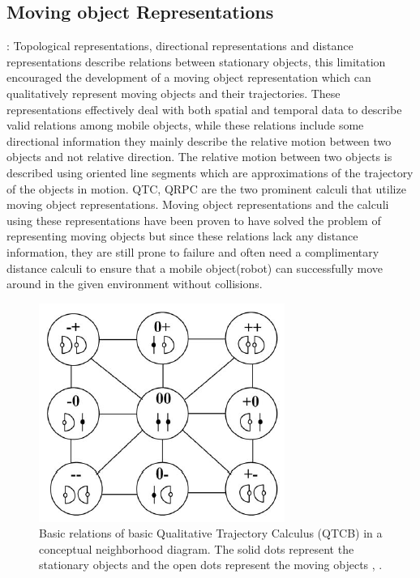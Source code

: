 		
		\subsection{Moving object Representations} \cite{chen2015survey} : Topological representations, directional representations and distance representations describe relations between stationary objects, this limitation encouraged the development of a moving object representation which can qualitatively represent moving objects and their trajectories. These representations effectively deal with both spatial and temporal data to describe valid relations among mobile objects, while these relations include some directional information they mainly describe the relative motion between two objects and not relative direction. The relative motion between two objects is described using oriented line segments which are approximations of the trajectory of the objects in motion. QTC, QRPC are the two prominent calculi that utilize moving object representations. Moving object representations and the calculi using these representations have been proven to have solved the problem of representing moving objects but since these relations lack any distance information, they are still prone to failure and often need a complimentary distance calculi to ensure that a mobile object(robot) can successfully move around in the given environment without collisions.
		
		\begin{figure}[h]
			\centering
			\includegraphics[scale=1]{images/qtcb}
			\caption{Basic relations of basic Qualitative Trajectory Calculus (QTCB) in a conceptual neighborhood diagram. The solid dots represent the stationary objects and the open dots represent the moving objects \cite{bibid}, \cite{de_weghe}.}
			\label{fig:qtcb}
		\end{figure}		
		
